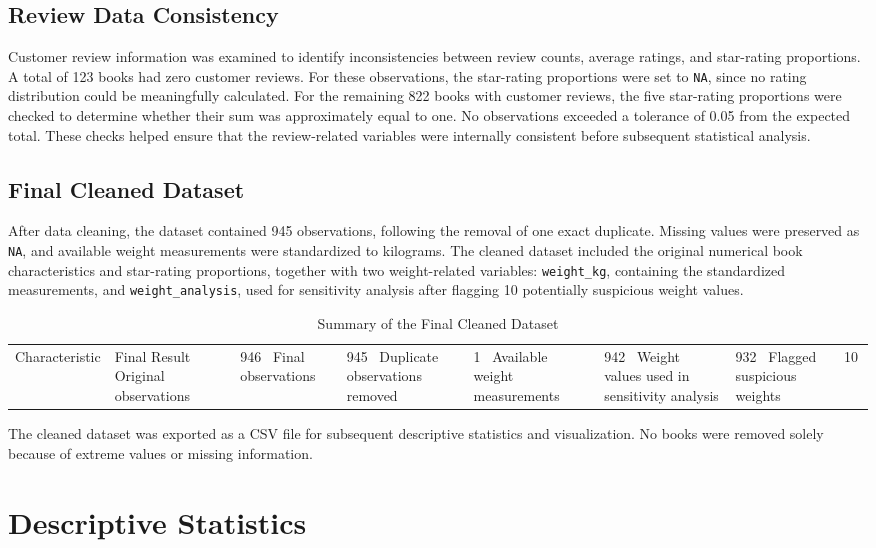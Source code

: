 \documentclass[11pt,a4paper]{article}
\begin{document}
\subsection{Review Data Consistency}
Customer review information was examined to identify
inconsistencies between review counts, average ratings,
and star-rating proportions.
A total of 123 books had zero customer reviews. For
these observations, the star-rating proportions were
set to \texttt{NA}, since no rating distribution could
be meaningfully calculated.
For the remaining 822 books with customer reviews,
the five star-rating proportions were checked to
determine whether their sum was approximately equal
to one. No observations exceeded a tolerance of
0.05 from the expected total.
These checks helped ensure that the review-related
variables were internally consistent before
subsequent statistical analysis.
\subsection{Final Cleaned Dataset}
After data cleaning, the dataset contained 945 observations,
following the removal of one exact duplicate. Missing values
were preserved as \texttt{NA}, and available weight measurements
were standardized to kilograms.
The cleaned dataset included the original numerical book
characteristics and star-rating proportions, together with
two weight-related variables: \texttt{weight_kg}, containing
the standardized measurements, and \texttt{weight_analysis},
used for sensitivity analysis after flagging 10 potentially
suspicious weight values.
\begin{table}[H]
\centering
\begin{tabular}{ll}
\toprule
Characteristic & Final Result \
\midrule
Original observations & 946 \
Final observations & 945 \
Duplicate observations removed & 1 \
Available weight measurements & 942 \
Weight values used in sensitivity analysis & 932 \
Flagged suspicious weights & 10 \
\bottomrule
\end{tabular}
\caption{Summary of the Final Cleaned Dataset}
\label{tab:cleaned}
\end{table}
The cleaned dataset was exported as a CSV file for
subsequent descriptive statistics and visualization.
No books were removed solely because of extreme values
or missing information.
\section{Descriptive Statistics}
\end{document}
